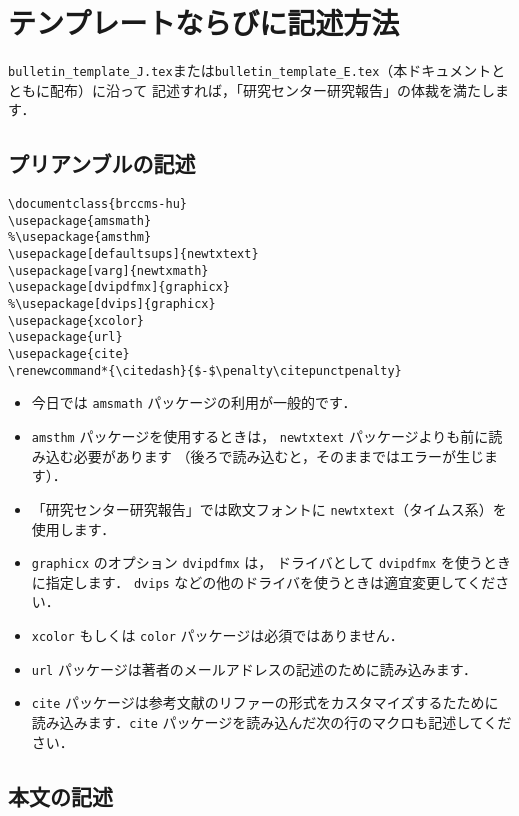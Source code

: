 \documentclass{brccms-hu}
\begin{document}
\section{テンプレートならびに記述方法}%

\texttt{bulletin_template_J.tex}または\texttt{bulletin_template_E.tex}（本ドキュメントとともに配布）に沿って
記述すれば，「研究センター研究報告」の体裁を満たします．

\makeatletter
\if@english
\makeatother
\else
\newpage
\fi

\subsection{プリアンブルの記述}

\begin{verbatim}
\documentclass{brccms-hu}
\usepackage{amsmath}
%\usepackage{amsthm}
\usepackage[defaultsups]{newtxtext}
\usepackage[varg]{newtxmath}
\usepackage[dvipdfmx]{graphicx}
%\usepackage[dvips]{graphicx}
\usepackage{xcolor}
\usepackage{url}
\usepackage{cite}
\renewcommand*{\citedash}{$-$\penalty\citepunctpenalty}
\end{verbatim}

\begin{itemize}
\item
今日では \texttt{amsmath} パッケージの利用が一般的です．
\item 
\texttt{amsthm} パッケージを使用するときは，
\texttt{newtxtext} パッケージよりも前に読み込む必要があります
（後ろで読み込むと，そのままではエラーが生じます）．
\item 
「研究センター研究報告」では欧文フォントに
\texttt{newtxtext}（タイムス系）を使用します．
\item
\verb/graphicx/ のオプション \texttt{dvipdfmx} は，
ドライバとして \texttt{dvipdfmx} を使うときに指定します．
\texttt{dvips} などの他のドライバを使うときは適宜変更してください．
\item
\texttt{xcolor} もしくは \texttt{color} パッケージは必須ではありません．
\item 
\texttt{url} パッケージは著者のメールアドレスの記述のために読み込みます．
\item 
\texttt{cite} パッケージは参考文献のリファーの形式をカスタマイズするたために読み込みます．\texttt{cite} パッケージを読み込んだ次の行のマクロも記述してください．
\end{itemize}

\subsection{本文の記述}
\end{document}
